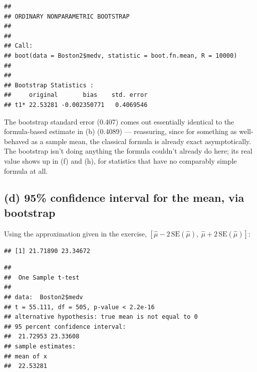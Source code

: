 \documentclass[
  11pt,
]{article}
\newenvironment{Shaded}{\begin{snugshade}}{\end{snugshade}}
\newcommand{\DecValTok}[1]{\textcolor[rgb]{0.00,0.00,0.81}{#1}}
\newcommand{\FunctionTok}[1]{\textcolor[rgb]{0.13,0.29,0.53}{\textbf{#1}}}
\newcommand{\NormalTok}[1]{#1}
\newcommand{\OtherTok}[1]{\textcolor[rgb]{0.56,0.35,0.01}{#1}}
\newcommand{\SpecialCharTok}[1]{\textcolor[rgb]{0.81,0.36,0.00}{\textbf{#1}}}
\begin{document}
\begin{verbatim}
## 
## ORDINARY NONPARAMETRIC BOOTSTRAP
## 
## 
## Call:
## boot(data = Boston2$medv, statistic = boot.fn.mean, R = 10000)
## 
## 
## Bootstrap Statistics :
##     original       bias    std. error
## t1* 22.53281 -0.002350771   0.4069546
\end{verbatim}

The bootstrap standard error (0.407) comes out essentially identical to
the formula-based estimate in (b) (0.4089) --- reassuring, since for
something as well-behaved as a sample mean, the classical formula is
already exact asymptotically. The bootstrap isn't doing anything the
formula couldn't already do here; its real value shows up in (f) and
(h), for statistics that have no comparably simple formula at all.

\subsection{(d) 95\% confidence interval for the mean, via
bootstrap}\label{d-95-confidence-interval-for-the-mean-via-bootstrap}

Using the approximation given in the exercise,
\([\hat\mu - 2\,\text{SE}(\hat\mu),\ \hat\mu + 2\,\text{SE}(\hat\mu)]\):

\begin{Shaded}
\end{Shaded}

\begin{verbatim}
## [1] 21.71890 23.34672
\end{verbatim}

\begin{Shaded}
\end{Shaded}

\begin{verbatim}
## 
##  One Sample t-test
## 
## data:  Boston2$medv
## t = 55.111, df = 505, p-value < 2.2e-16
## alternative hypothesis: true mean is not equal to 0
## 95 percent confidence interval:
##  21.72953 23.33608
## sample estimates:
## mean of x 
##  22.53281
\end{verbatim}
\end{document}
